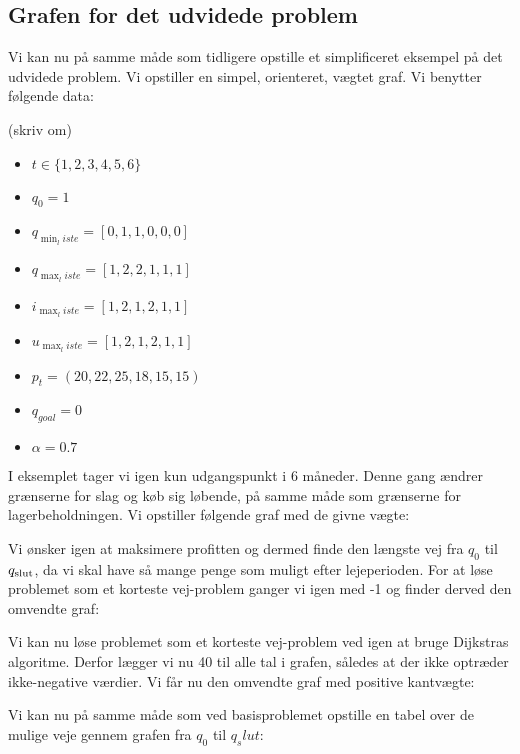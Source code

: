 \subsection{Grafen for det udvidede problem} \label{kap:grafen_for_udvidet}
Vi kan nu på samme måde som tidligere opstille et simplificeret eksempel på det udvidede problem. Vi opstiller en simpel, orienteret, vægtet graf. Vi benytter følgende data:

(skriv om)
\begin{itemize}
  \item $t \in \{1,2,3,4,5,6\}$
  \item $q_{0}=1$
  \item $q_{\min_liste}=[0,1,1,0,0,0]$
  \item $q_{\max_liste}=[1,2,2,1,1,1]$
  \item $i_{\max_liste}=[1,2,1,2,1,1]$
  \item $u_{\max_liste}=[1,2,1,2,1,1]$
  \item $p_{t}=(20,22,25,18,15,15)$
  \item $q_{goal}=0$
  \item $\alpha=0.7$
\end{itemize}

I eksemplet tager vi igen kun udgangspunkt i 6 måneder. Denne gang ændrer grænserne for slag og køb sig løbende, på samme måde som grænserne for lagerbeholdningen. Vi opstiller følgende graf med de givne vægte:



Vi ønsker igen at maksimere profitten og dermed finde den længste vej fra $q_{0}$ til $q_{\textrm{slut}}$, da vi skal have så mange penge som muligt efter lejeperioden. For at løse problemet som et korteste vej-problem ganger vi igen med -1 og finder derved den omvendte graf:



Vi kan nu løse problemet som et korteste vej-problem ved igen at bruge Dijkstras algoritme. Derfor lægger vi nu 40 til alle tal i grafen, således at der ikke optræder ikke-negative værdier. Vi får nu den omvendte graf med positive kantvægte:




Vi kan nu på samme måde som ved basisproblemet opstille en tabel over de mulige veje gennem grafen fra $q_0$ til $q_slut$:

 


